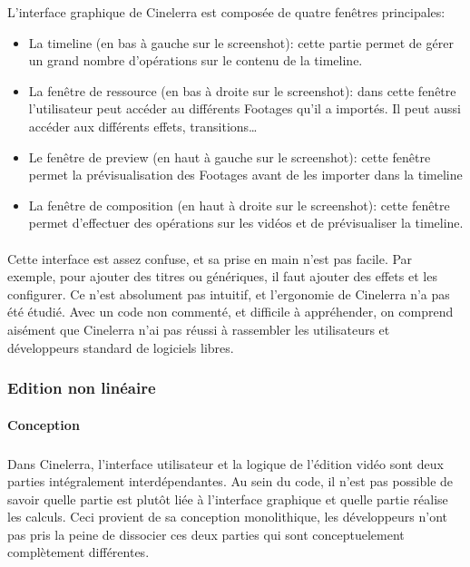 L'interface graphique de Cinelerra est composée de quatre fenêtres
principales:

\begin{itemize}
  \item {La timeline (en bas à gauche sur le screenshot): cette
    partie permet de gérer un grand nombre d'opérations sur le contenu
    de la timeline.}

  \item {La fenêtre de ressource (en bas à droite sur le screenshot):
    dans cette fenêtre l'utilisateur peut accéder au différents
    Footages qu'il a importés. Il peut aussi accéder aux différents
    effets, transitions\ldots}

  \item {Le fenêtre de preview (en haut à gauche sur le screenshot):
    cette fenêtre permet la prévisualisation des Footages avant de
    les importer dans la timeline}

  \item {La fenêtre de composition (en haut à droite sur le screenshot):
    cette fenêtre permet d'effectuer des opérations sur les vidéos
    et de prévisualiser la timeline.}

\end{itemize}

\paragraph{}

Cette interface est assez confuse, et sa prise en main n'est pas facile.
Par exemple, pour ajouter des titres ou génériques, il faut ajouter des
effets et les configurer. Ce n'est absolument pas intuitif, et l'ergonomie
de Cinelerra n'a pas été étudié. Avec un code non commenté, et
difficile à appréhender, on comprend aisément que Cinelerra n'ai
pas réussi à rassembler les utilisateurs et développeurs standard de
logiciels libres.

\subsubsection{Edition non linéaire}

\paragraph{Conception}

\subparagraph{}

Dans Cinelerra, l'interface utilisateur et la logique de l'édition
vidéo sont deux parties intégralement interdépendantes. Au sein du
code, il n'est pas possible de savoir quelle partie est plutôt liée
à l'interface graphique et quelle partie réalise les calculs. Ceci
provient de sa conception monolithique, les développeurs n'ont pas
pris la peine de dissocier ces deux parties qui sont conceptuelement
complètement différentes.

